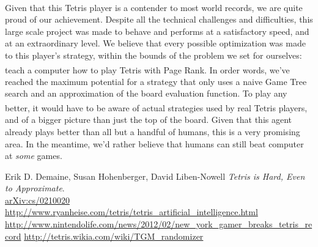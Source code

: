 \documentclass[fontsize=12pt]{article}
\def\tetris{Tetris\textsuperscript{\textregistered}}
\begin{document}
\par Given that this \tetris{} player is a contender to most world records, we are quite proud of our achievement. Despite all the technical challenges and difficulties, this large scale project was made to behave and performs at a satisfactory speed, and at an extraordinary level. We believe that every possible optimization was made to this player's strategy, within the bounds of the problem we set for ourselves: teach a computer how to play \tetris{} with Page Rank. In order words, we've reached the maximum potential for a strategy that only uses a naive Game Tree search and an approximation of the board evaluation function. To play any better, it would have to be aware of actual strategies used by real \tetris{} players, and of a bigger picture than just the top of the board. Given that this agent already plays better than all but a handful of humans, this is a very promising area. In the meantime, we'd rather believe that humans can still beat computer at \emph{some} games.


\newpage
\begin{thebibliography}{9}
Erik D. Demaine, Susan Hohenberger, David Liben-Nowell
\textit{Tetris is Hard, Even to Approximate}.
\\\href{https://arxiv.org/abs/cs/0210020}{arXiv:cs/0210020}
  \url{http://www.ryanheise.com/tetris/tetris_artificial_intelligence.html}
  \url{http://www.nintendolife.com/news/2012/02/new_york_gamer_breaks_tetris_record}
  \url{http://tetris.wikia.com/wiki/TGM_randomizer}
\end{thebibliography}
\end{document}
